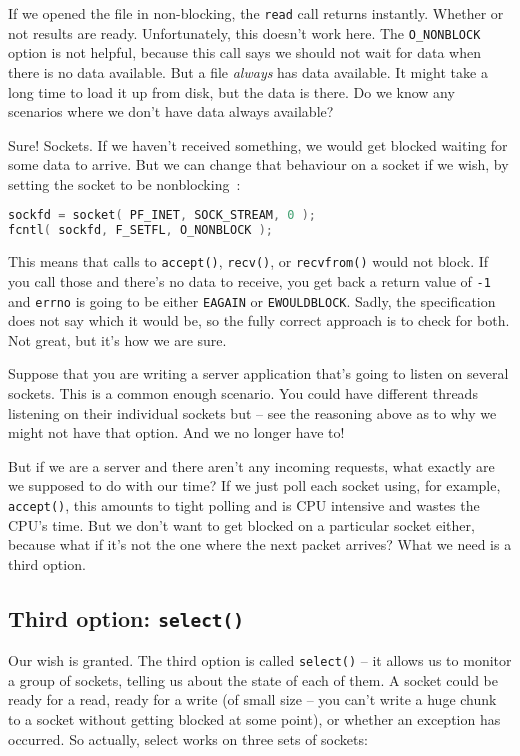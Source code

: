 If we opened the file in non-blocking, the \texttt{read} call returns instantly. Whether or not results are ready. Unfortunately, this doesn't work here. The \texttt{O\_NONBLOCK} option is not helpful, because this call says we should not wait for data when there is no data available. But a file \textit{always} has data available. It might take a long time to load it up from disk, but the data is there. Do we know any scenarios where we don't have data always available?

Sure! Sockets. If we haven't received something, we would get blocked waiting for some data to arrive. But we can change that behaviour on a socket if we wish, by setting the socket to be nonblocking~\cite{getaddrinfo}:

\begin{lstlisting}[language=C]
sockfd = socket( PF_INET, SOCK_STREAM, 0 );
fcntl( sockfd, F_SETFL, O_NONBLOCK );
\end{lstlisting}

This means that calls to \texttt{accept()}, \texttt{recv()}, or \texttt{recvfrom()} would not block. If you call those and there's no data to receive, you get back a return value of \texttt{-1} and \texttt{errno} is going to be either \texttt{EAGAIN} or \texttt{EWOULDBLOCK}. Sadly, the specification does not say which it would be, so the fully correct approach is to check for both. Not great, but it's how we are sure.

Suppose that you are writing a server application that's going to listen on several sockets. This is a common enough scenario. You could have different threads listening on their individual sockets but -- see the reasoning above as to why we might not have that option. And we no longer have to!

But if we are a server and there aren't any incoming requests, what exactly are we supposed to do with our time? If we just poll each socket using, for example, \texttt{accept()}, this amounts to tight polling and is CPU intensive and wastes the CPU's time. But we don't want to get blocked on a particular socket either, because what if it's not the one where the next packet arrives? What we need is a third option.

\subsection*{Third option: \texttt{select()}} Our wish is granted. The third option is called \texttt{select()} -- it allows us to monitor a group of sockets, telling us about the state of each of them. A socket could be ready for a read, ready for a write (of small size -- you can't write a huge chunk to a socket without getting blocked at some point), or whether an exception has occurred. So actually, select works on three sets of sockets:


